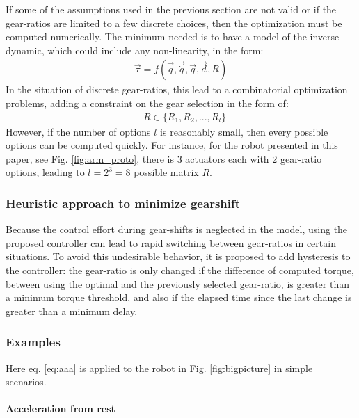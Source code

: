 If some of the assumptions used in the previous section are not valid or if the gear-ratios are limited to a few discrete choices, then the optimization must be computed numerically. The minimum needed is to have a model of the inverse dynamic, which could include any non-linearity, in the form:
\begin{align}
	\vec{\tau}  = f( \vec{\ddot{q}} , \vec{\dot{q}} , \vec{q} , \vec{d} , R ) 
\end{align}
In the situation of discrete gear-ratios, this lead to a combinatorial optimization problems, adding a constraint on the gear selection in the form of:
\begin{align}
	&  R \in \{R_1,R_2, ... , R_l\} 
\end{align}
However, if the number of options $l$ is reasonably small, then every possible options can be computed quickly. For instance, for the robot presented in this paper, see Fig. \ref{fig:arm_proto}, there is 3 actuators each with 2 gear-ratio options, leading to $l=2^3=8$ possible matrix $R$.



\subsubsection{Heuristic approach to minimize gearshift}

Because the control effort during gear-shifts is neglected in the model, using the proposed controller can lead to rapid switching between gear-ratios in certain situations. To avoid this undesirable behavior, it is proposed to add hysteresis to the controller: the gear-ratio is only changed if the difference of computed torque, between using the optimal and the previously selected gear-ratio, is greater than a minimum torque threshold, and also if the elapsed time since the last change is greater than a minimum delay. 



\subsubsection{Examples}
\label{sec:Examples}

Here eq. \eqref{eq:aaa} is applied to the robot in Fig. \ref{fig:bigpicture} in simple scenarios. 

\paragraph{Acceleration from rest} 

